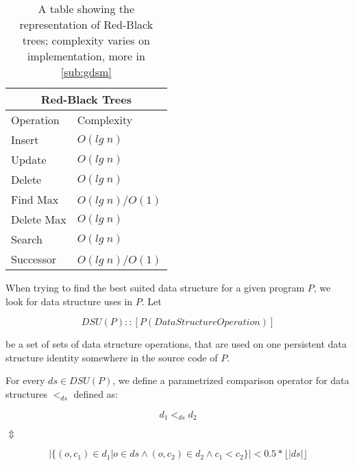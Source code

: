 \documentclass[a4paper,11pt]{article}
\begin{document}
		\begin{table}[h!]
			\centering
			\begin{tabular}{|l|l|}
				\hline
				\multicolumn{2}{|c|}{Red-Black Trees} \\
				\hline
				Operation & Complexity \\
				\hline
				Insert 	        & $O(lg \; n)$ \\
				Update          & $O(lg \; n)$ \\
				Delete	        & $O(lg \; n)$ \\
				Find Max 	& $O(lg \; n)$/$O(1)$\\
				Delete Max	& $O(lg \; n)$ \\
				Search 		& $O(lg \; n)$ \\
				Successor 	& $O(lg \; n)$/$O(1)$\\
				\hline
			\end{tabular}
			\caption{A table showing the representation of Red-Black trees; complexity varies on
			implementation, more in \autoref{sub:gdsm}}
			\label{tab:rbt}
		\end{table}

		When trying to find the best suited data structure for a given program $P$, we look for data structure
		uses in $P$. Let

		\begin{equation}\label{dsu-type}
			DSU(P) :: [P(DataStructureOperation)]
		\end{equation}

		be a set of sets of data structure operations, that are used on one persistent data structure identity
		somewhere in the source code of $P$.

		For every $ds \in DSU(P)$, we define a parametrized comparison operator for data structures $<_{ds}$
		defined as:

		\begin{center}

			\begin{equation}
				d_1 <_{ds} d_2
			\end{equation}

			$\Updownarrow$

			\begin{equation} \label{data-structure-order}
				|\{(o, c_1) \in d_1 | o \in ds \wedge (o,c_2) \in d_2 \wedge c_1 < c_2 \}| < 0.5 *
				\lfloor |ds| \rfloor
			\end{equation}

		\end{center}
\end{document}

